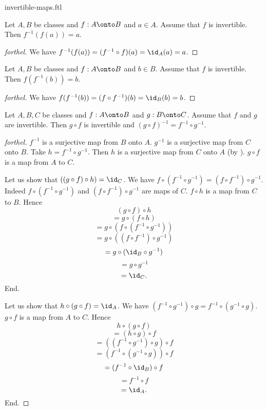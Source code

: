 \documentclass{naproche-library}
\begin{document}
\begin{smodule}{invertible-maps.ftl}
  \begin{proposition}[forthel,id=FOUNDATIONS_09_4606651604664320,printid]
    Let $A, B$ be classes and $f : A \onto B$ and $a \in A$.
    Assume that $f$ is invertible.
    Then $f^{-1}(f(a)) = a$.
  \end{proposition}
  \begin{proof}[forthel]
    We have $f^{-1}(f(a)) = (f^{-1} \circ f)(a) = \id_{A}(a) = a$.
  \end{proof}

  \begin{proposition}[forthel,id=FOUNDATIONS_09_6093864386712935,printid]
    Let $A, B$ be classes and $f : A \onto B$ and $b \in B$.
    Assume that $f$ is invertible.
    Then $f(f^{-1}(b)) = b$.
  \end{proposition}
  \begin{proof}[forthel]
    We have
    $f(f^{-1}(b))
      = (f \circ f^{-1})(b)
      = \id_{B}(b)
      = b$.
  \end{proof}

  \begin{proposition}[forthel,id=FOUNDATIONS_09_7619151963095040,printid]
    Let $A, B, C$ be classes and $f : A \onto B$ and $g : B \onto C$.
    Assume that $f$ and $g$ are invertible.
    Then $g \circ f$ is invertible and $(g \circ f)^{-1} = f^{-1} \circ g^{-1}$.
  \end{proposition}
  \begin{proof}[forthel]
    $f^{-1}$ is a surjective map from $B$ onto $A$.
    $g^{-1}$ is a surjective map from $C$ onto $B$.
    Take $h = f^{-1} \circ g^{-1}$.
    Then $h$ is a surjective map from $C$ onto $A$ (by ).
    $g \circ f$ is a map from $A$ to $C$.

    Let us show that $((g \circ f) \circ h) = \id_{C}$.
      We have $f \circ (f^{-1} \circ g^{-1}) = (f \circ f^{-1}) \circ g^{-1}$.
      Indeed $f \circ (f^{-1} \circ g^{-1})$ and $(f \circ f^{-1}) \circ g^{-1}$ are maps of $C$.
      $f \circ h$ is a map from $C$ to $B$.
      Hence
      \[  (g \circ f) \circ h                           \]
      \[    = g \circ (f \circ h)                       \]
      \[    = g \circ (f \circ (f^{-1} \circ g^{-1}))   \]
      \[    = g \circ ((f \circ f^{-1}) \circ g^{-1})   \]
      \[    = g \circ (\id_{B} \circ g^{-1})            \]
      \[    = g \circ g^{-1}                            \]
      \[    = \id_{C}.                                  \]
    End.

    Let us show that $h \circ (g \circ f) = \id_{A}$.
      We have $(f^{-1} \circ g^{-1}) \circ g = f^{-1} \circ (g^{-1} \circ g)$.
      $g \circ f$ is a map from $A$ to $C$.
      Hence
      \[  h \circ (g \circ f)                           \]
      \[    = (h \circ g) \circ f                       \]
      \[    = ((f^{-1} \circ g^{-1}) \circ g) \circ f   \]
      \[    = (f^{-1} \circ (g^{-1} \circ g)) \circ f   \]
      \[    = (f^{-1} \circ \id_{B}) \circ f            \]
      \[    = f^{-1} \circ f                            \]
      \[    = \id_{A}.                                  \]
    End.


\end{proof}
\end{smodule}
\end{document}

